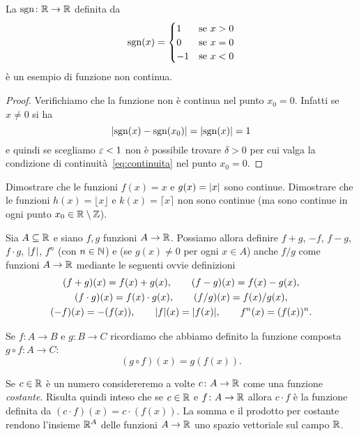 \begin{example}
La  $\operatorname{sgn}\colon \mathbb R \to \mathbb R$ definita da
\[
  \operatorname{sgn}(x) = \begin{cases}
  1 & \text{se $x> 0$}\\
  0 & \text{se $x=0$}\\
  -1 & \text{se $x<0$}
  \end{cases}
\]
è un esempio di funzione non continua.
\end{example}
%
\begin{proof}
Verifichiamo che la funzione non è continua
nel punto $x_0=0$.
Infatti se $x\neq 0$ si ha
\[
{\left|\operatorname{sgn}(x)-\operatorname{sgn}(x_0)\right|} = {\left|\operatorname{sgn}(x)\right|} = 1
\]
e quindi se scegliamo $\varepsilon<1$ non è possibile
trovare $\delta>0$ per cui valga la condizione
di continuità~\eqref{eq:continuita}
nel punto $x_0=0$.
\end{proof}

\begin{exercise}
Dimostrare che le funzioni $f(x) = x$ e $g(x)={\left|x\right|}$ sono continue.
Dimostrare che le funzioni $h(x) = \lfloor x\rfloor$ e $k(x)=\lceil x \rceil$
non sono continue (ma sono continue in ogni punto
$x_0\in \mathbb R \setminus \mathbb Z$).
\end{exercise}

\begin{definition}
Sia $A \subseteq \mathbb R$ e siano $f,g$ funzioni $A \to \mathbb R$.
Possiamo allora definire
$f+g$, $-f$, $f-g$, $f\cdot g$, ${\left|f\right|}$, $f^n$ (con $n\in \mathbb N$)
e (se $g(x)\neq 0$ per ogni $x\in A$) anche $f/g$
come funzioni $A \to \mathbb R$ mediante le seguenti ovvie
definizioni
\begin{gather*}
(f+g)(x) = f(x) + g(x), \qquad
(f-g)(x) = f(x) - g(x), \\
(f\cdot g)(x) = f(x) \cdot g(x), \qquad
(f/g)(x) = f(x) / g(x), \\
(-f)(x) = -(f(x)), \qquad
{\left|f\right|}(x) = {\left|f(x)\right|}, \qquad
f^n(x) = (f(x))^n.
\end{gather*}

Se $f\colon A \to B$ e $g\colon B\to C$ ricordiamo
che abbiamo definito la funzione composta
$g\circ f\colon A \to C$:
\[
  (g\circ f)(x) = g(f(x)).
\]

Se $c\in \mathbb R$ è un numero considereremo a volte $c\colon A \to \mathbb R$
come una funzione \emph{costante}.
Risulta quindi inteso che se $c\in \mathbb R$ e $f\colon A \to \mathbb R$
allora $c\cdot f$ è la funzione definita da
$(c\cdot f)(x) = c\cdot (f(x))$.
La somma e il prodotto per costante rendono l'insieme $\mathbb R^A$
delle funzioni $A \to \mathbb R$ uno spazio vettoriale sul campo $\mathbb R$.
\end{definition}

